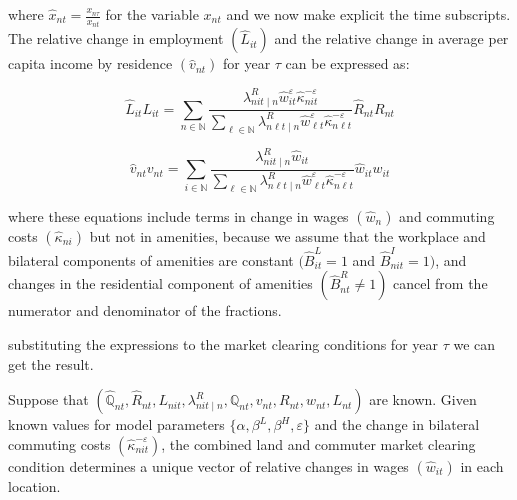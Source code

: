 where $\hat{x}_{nt} = \frac{x_{n\tau}}{x_{nt}}$ for the variable $x_{nt}$ and we now make explicit the time subscripts. The relative change in employment $(\hat{L}_{it})$ and the relative change in average per capita income by residence $(\hat{v}_{nt})$ for year $\tau$ can be expressed as:

\begin{equation}
    \hat{L}_{it} L_{it} = \sum_{n \in \mathbb{N}} \frac{\lambda_{nit\mid n}^R \hat{w}_{it}^{\varepsilon} \hat{\kappa}_{nit}^{-\varepsilon}}{\sum_{\ell \in \mathbb{N}} \lambda_{n\ell t \mid n}^R \hat{w}_{\ell t}^{\varepsilon} \hat{\kappa}_{n\ell t}^{-\varepsilon}  } \hat{R}_{nt} R_{nt} 
\end{equation}

\begin{equation}
    \hat{v}_{nt} v_{nt} = \sum_{i \in \mathbb{N}} \frac{\lambda_{nit \mid n}^R \hat{w}_{it}}{\sum_{\ell \in \mathbb{N}} \lambda_{n\ell t \mid n}^R \hat{w}_{\ell t}^{\varepsilon} \hat{\kappa}_{n\ell t}^{-\varepsilon}  } \hat{w}_{it} w_{it}
\end{equation}

where these equations include terms in change in wages $(\hat{w}_{n})$ and commuting costs $(\hat{\kappa}_{ni})$ but not in amenities, because we assume that the workplace and bilateral components of amenities are constant $(\hat{B}_{it}^L = 1$ and $\hat{B}_{nit}^I = 1)$, and changes in the residential component of amenities $(\hat{B}_{nt}^R \neq 1)$ cancel from the numerator and denominator of the fractions.

substituting the expressions to the market clearing conditions for year $\tau$ we can get the result.

\begin{lemma}
    Suppose that $(\hat{\mathbb{Q}}_{nt}, \hat{R}_{nt}, L_{nit}, \lambda_{nit \mid n}^R, \mathbb{Q}_{nt}, v_{nt}, R_{nt}, w_{nt}, L_{nt})$ are known. Given known values for model parameters $\{\alpha, \beta^L, \beta^H, \varepsilon\}$ and the change in bilateral commuting costs $(\hat{\kappa}_{nit}^{-\varepsilon})$, the combined land and commuter market clearing condition determines a unique vector of relative changes in wages $(\hat{w}_{it})$ in each location.
\end{lemma}
